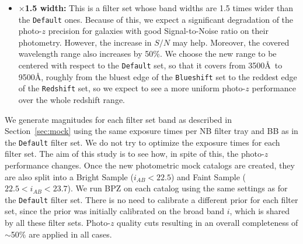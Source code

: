 \begin{itemize}
\item \textbf{$\times$1.5 width:} This is a filter set whose band widths are 1.5 times wider than the \texttt{Default} ones. Because of this, we expect a significant degradation of the photo-$z$ precision for galaxies with good Signal-to-Noise ratio on their photometry. However, the increase in $S/N$ may help. Moreover, the covered wavelength range also increases by 50\%. We choose the new range to be centered with respect to the \texttt{Default} set, so that it covers from 3500\AA \ to 9500\AA, roughly from the bluest edge of the \texttt{Blueshift} set to the reddest edge of the \texttt{Redshift} set, so we expect to see a more uniform photo-$z$ performance over the whole redshift range.
\end{itemize}

We generate magnitudes for each filter set band as described in Section~\ref{sec:mock} using the same exposure times per NB filter tray and BB as in the \texttt{Default} filter set. We do not try to optimize the exposure times for each filter set. The aim of this study is to see how, in spite of this, the photo-$z$ performance changes. Once the new photometric mock catalogs are created, they are also split into a Bright Sample ($i_{AB}<22.5$) and Faint Sample ($22.5<i_{AB}<23.7$). We run BPZ on each catalog using the same settings as for the \texttt{Default} filter set. There is no need to calibrate a different prior for each filter set, since the prior was initially calibrated on the broad band $i$, which is shared by all these filter sets. Photo-$z$ quality cuts resulting in an overall completeness of $\sim$50\% are applied in all cases.
